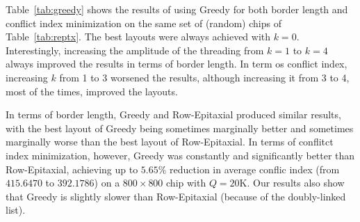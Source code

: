 Table~\ref{tab:greedy} shows the results of using Greedy for both border length
and conflict index minimization on the same set of (random) chips of
Table~\ref{tab:reptx}. The best layouts were always achieved with $k=0$.
Interestingly, increasing the amplitude of the threading from $k=1$ to $k=4$
always improved the results in terms of border length. In term os conflict
index, increasing $k$ from 1 to 3 worsened the results, although increasing it
from 3 to 4, most of the times, improved the layouts.

In terms of border length, Greedy and Row-Epitaxial produced similar results,
with the best layout of Greedy being sometimes marginally better and sometimes
marginally worse than the best layout of Row-Epitaxial. In terms of conflitct
index minimization, however, Greedy was constantly and significantly better than
Row-Epitaxial, achieving up to $5.65\%$ reduction in average conflic index (from
$415.6470$ to $392.1786$) on a $800\times 800$ chip with $Q=20$K. Our results
also show that Greedy is slightly slower than Row-Epitaxial (because of the
doubly-linked list).

